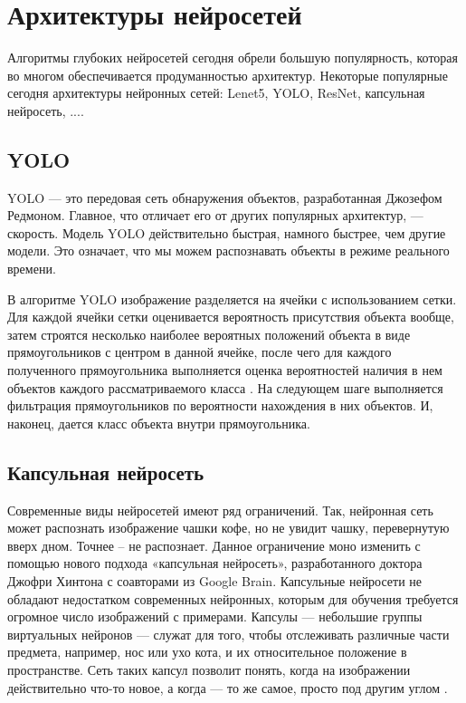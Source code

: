 \section{Архитектуры нейросетей}

Алгоритмы глубоких нейросетей сегодня обрели большую популярность, которая во многом обеспечивается продуманностью архитектур. Некоторые популярные сегодня архитектуры нейронных сетей: Lenet5, YOLO, ResNet, капсульная нейросеть, ....

\subsection{YOLO}

YOLO — это передовая сеть обнаружения объектов, разработанная Джозефом Редмоном. Главное, что отличает его от других популярных архитектур, — скорость. Модель YOLO действительно быстрая, намного быстрее, чем другие модели. Это означает, что мы можем распознавать объекты в режиме реального времени.

В алгоритме YOLO изображение разделяется на ячейки с использованием сетки. Для каждой ячейки сетки оценивается вероятность присутствия объекта вообще, затем строятся несколько наиболее вероятных положений объекта в виде прямоугольников с центром в данной ячейке, после чего для каждого полученного прямоугольника выполняется оценка вероятностей наличия в нем объектов каждого рассматриваемого класса \cite{neronnetwork13}. На следующем шаге выполняется фильтрация прямоугольников по вероятности нахождения в них объектов. И, наконец, дается класс объекта внутри прямоугольника.

\subsection{Капсульная нейросеть}

Современные виды нейросетей имеют ряд ограничений. Так, нейронная сеть может распознать изображение чашки кофе, но не увидит чашку, перевернутую вверх дном. Точнее – не распознает. Данное ограничение моно изменить с помощью нового подхода «капсульная нейросеть», разработанного доктора Джофри Хинтона с соавторами из Google Brain. Капсульные нейросети не обладают недостатком современных нейронных, которым для обучения требуется огромное число изображений с примерами. Капсулы — небольшие группы виртуальных нейронов — служат для того, чтобы отслеживать различные части предмета, например, нос или ухо кота, и их относительное положение в пространстве. Сеть таких капсул позволит понять, когда на изображении действительно что-то новое, а когда — то же самое, просто под другим углом \cite{neronnetwork14}. 

